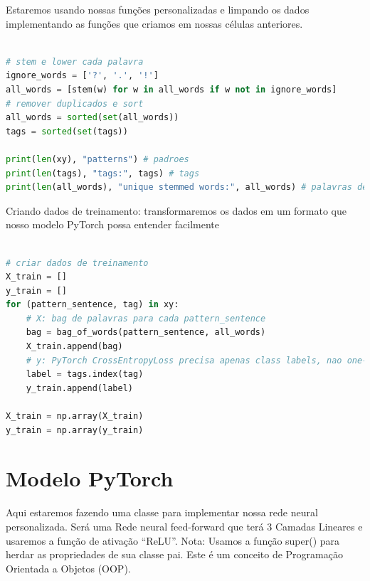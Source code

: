 Estaremos usando nossas funções personalizadas e limpando os dados implementando as funções que criamos em nossas células anteriores.

\begin{lstlisting}[language=Python, caption=Data Cleaning]

# stem e lower cada palavra
ignore_words = ['?', '.', '!']
all_words = [stem(w) for w in all_words if w not in ignore_words]
# remover duplicados e sort
all_words = sorted(set(all_words))
tags = sorted(set(tags))

print(len(xy), "patterns") # padroes
print(len(tags), "tags:", tags) # tags
print(len(all_words), "unique stemmed words:", all_words) # palavras derivadas unicas

\end{lstlisting}

Criando dados de treinamento: transformaremos os dados em um formato que nosso modelo PyTorch possa entender facilmente

\begin{lstlisting}[language=Python, caption=Training Data]

# criar dados de treinamento
X_train = []
y_train = []
for (pattern_sentence, tag) in xy:
    # X: bag de palavras para cada pattern_sentence
    bag = bag_of_words(pattern_sentence, all_words)
    X_train.append(bag)
    # y: PyTorch CrossEntropyLoss precisa apenas class labels, nao one-hot
    label = tags.index(tag)
    y_train.append(label)

X_train = np.array(X_train)
y_train = np.array(y_train)

\end{lstlisting}

\section[Modelo PyTorch]{Modelo PyTorch}

Aqui estaremos fazendo uma classe para implementar nossa rede neural personalizada. Será uma Rede neural feed-forward que terá 3 Camadas Lineares e usaremos a função de ativação “ReLU”. Nota: Usamos a função super() para herdar as propriedades de sua classe pai. Este é um conceito de Programação Orientada a Objetos (OOP).

